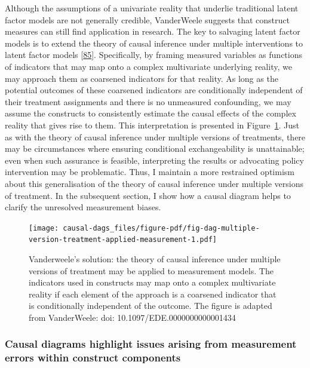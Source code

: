 \documentclass[
  singlecolumn]{article}
\begin{document}
Although the assumptions of a univariate reality that underlie
traditional latent factor models are not generally credible, VanderWeele
suggests that construct measures can still find application in research.
The key to salvaging latent factor models is to extend the theory of
causal inference under multiple interventions to latent factor models
{[}\protect\hyperlink{ref-vanderweele2022}{85}{]}. Specifically, by
framing measured variables as functions of indicators that may map onto
a complex multivariate underlying reality, we may approach them as
coarsened indicators for that reality. As long as the potential outcomes
of these coarsened indicators are conditionally independent of their
treatment assignments and there is no unmeasured confounding, we may
assume the constructs to consistently estimate the causal effects of the
complex reality that gives rise to them. This interpretation is
presented in
Figure~\ref{fig-dag-multiple-version-treatment-applied-measurement}.
Just as with the theory of causal inference under multiple versions of
treatments, there may be circumstances where ensuring conditional
exchangeability is unattainable; even when such assurance is feasible,
interpreting the results or advocating policy intervention may be
problematic. Thus, I maintain a more restrained optimism about this
generalisation of the theory of causal inference under multiple versions
of treatment. In the subsequent section, I show how a causal diagram
helps to clarify the unresolved measurement biases.

\begin{figure}

{\centering \texttt{[image: causal-dags\_files/figure-pdf/fig-dag-multiple-version-treatment-applied-measurement-1.pdf]}

}

\caption{\label{fig-dag-multiple-version-treatment-applied-measurement}Vanderweele's
solution: the theory of causal inference under multiple versions of
treatment may be applied to measurement models. The indicators used in
constructs may map onto a complex multivariate reality if each element
of the approach is a coarsened indicator that is conditionally
independent of the outcome. The figure is adapted from VanderWeele: doi:
10.1097/EDE.0000000000001434}

\end{figure}

\hypertarget{causal-diagrams-highlight-issues-arising-from-measurement-errors-within-construct-components}{%
\subsubsection{Causal diagrams highlight issues arising from measurement
errors within construct
components}\label{causal-diagrams-highlight-issues-arising-from-measurement-errors-within-construct-components}}
\end{document}
